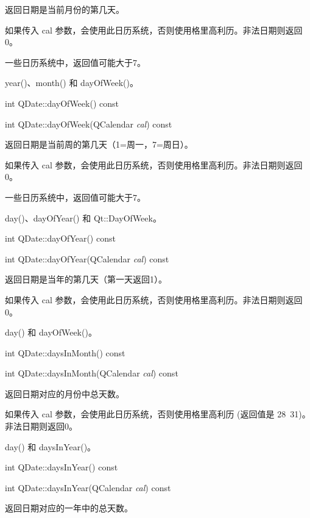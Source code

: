 返回日期是当前月份的第几天。

如果传入 cal 参数，会使用此日历系统，否则使用格里高利历。非法日期则返回0。

一些日历系统中，返回值可能大于7。

\begin{notice}[另请参阅]
year()、month() 和 dayOfWeek()。
\end{notice}

\splitLine

int QDate::dayOfWeek() const

int QDate::dayOfWeek(QCalendar \emph{cal}) const

返回日期是当前周的第几天（1=周一，7=周日）。

如果传入 cal 参数，会使用此日历系统，否则使用格里高利历。非法日期则返回0。

一些日历系统中，返回值可能大于7。

\begin{notice}[另请参阅]
day()、dayOfYear() 和 Qt::DayOfWeek。
\end{notice}

\splitLine

int QDate::dayOfYear() const

int QDate::dayOfYear(QCalendar \emph{cal}) const

返回日期是当年的第几天（第一天返回1）。

如果传入 cal 参数，会使用此日历系统，否则使用格里高利历。非法日期则返回0。

\begin{notice}[另请参阅]
day() 和 dayOfWeek()。
\end{notice}

\splitLine

int QDate::daysInMonth() const

int QDate::daysInMonth(QCalendar \emph{cal}) const

返回日期对应的月份中总天数。

如果传入 cal 参数，会使用此日历系统，否则使用格里高利历 (返回值是 28~31)。非法日期则返回0。



\begin{notice}[另请参阅]
day() 和 daysInYear()。
\end{notice}

\splitLine

int QDate::daysInYear() const

int QDate::daysInYear(QCalendar \emph{cal}) const

返回日期对应的一年中的总天数。

